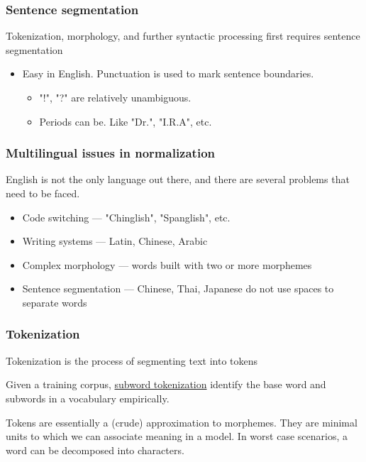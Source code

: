 \documentclass[11pt]{article}
\begin{document}
\subsubsection{Sentence segmentation}

Tokenization, morphology, and further syntactic processing first requires
sentence segmentation

\begin{itemize}
	\item Easy in English. Punctuation is used to mark sentence boundaries.

	      \begin{itemize}
		      \item "!", "?" are relatively unambiguous.
		      \item Periods can be. Like "Dr.", "I.R.A", etc.
	      \end{itemize}
\end{itemize}

\subsubsection{Multilingual issues in normalization}

English is not the only language out there, and there are several problems that
need to be faced.

\begin{itemize}
	\item Code switching --- "Chinglish", "Spanglish", etc.
	\item Writing systems --- Latin, Chinese, Arabic
	\item Complex morphology --- words built with two or more morphemes
	\item Sentence segmentation --- Chinese, Thai, Japanese do not use spaces to
	      separate words
\end{itemize}

\subsubsection{Tokenization}

Tokenization is the process of segmenting text into tokens

Given a training corpus, \underline{subword tokenization} identify the base word
and subwords in a vocabulary empirically.

Tokens are essentially a (crude) approximation to morphemes. They are minimal
units to which we can associate meaning in a model. In worst case scenarios, a
word can be decomposed into characters.
\end{document}
